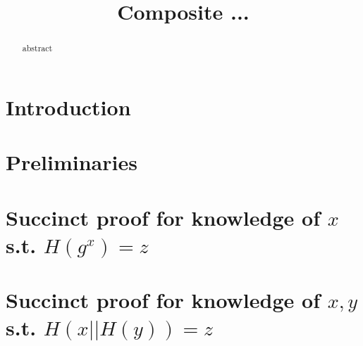\documentclass{llncs}
\title{Composite ...}
\begin{document}
\maketitle
\begin{abstract} 
 abstract
  \end{abstract} 



\section{Introduction}

%

\section{Preliminaries}\label{sec:prelims}



\section{Succinct proof for knowledge of $x$ s.t. $H(g^x)=z$}\label{sec:knowledgexKEA}



\section{Succinct proof for knowledge of $x,y$ s.t. $H(x||H(y))=z$}\label{sec:knowledgexyHH}








%
\end{document}
